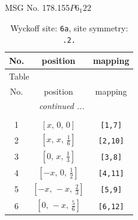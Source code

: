 \documentclass[fleqn,8pt]{jsarticle}
\begin{document}
\setcounter{MaxMatrixCols}{32}

\renewcommand{\tablename}{Table~}
\renewcommand{\figurename}{Figure~}
\begin{center}
\LARGE
MSG No. 178.155\quad$P6_{1}22$
\end{center}
\renewcommand{\arraystretch}{1.2}
\begin{longtable}{ccc}
\caption{Wyckoff site: {\tt 6a}, site symmetry: {\tt .2.}}
 \\
 \hline \hline
No. & position & mapping \\ \hline \endfirsthead

\multicolumn{2}{l}{\tablename\ \thetable{}} \\
 \hline \hline
No. & position & mapping \\ \hline \endhead

 \hline \hline
\multicolumn{2}{r}{\footnotesize\it continued ...} \\ \endfoot

 \hline \hline
\multicolumn{2}{r}{} \\ \endlastfoot

1 & $\left[ x,\, 0,\, 0 \right]$ & {\tt [1,7]} \\ \hline
2 & $\left[ x,\, x,\, \frac{1}{6} \right]$ & {\tt [2,10]} \\ \hline
3 & $\left[ 0,\, x,\, \frac{1}{3} \right]$ & {\tt [3,8]} \\ \hline
4 & $\left[ - x,\, 0,\, \frac{1}{2} \right]$ & {\tt [4,11]} \\ \hline
5 & $\left[ - x,\, - x,\, \frac{2}{3} \right]$ & {\tt [5,9]} \\ \hline
6 & $\left[ 0,\, - x,\, \frac{5}{6} \right]$ & {\tt [6,12]} \\
\end{longtable}
\renewcommand{\arraystretch}{1.2}
\end{document}
